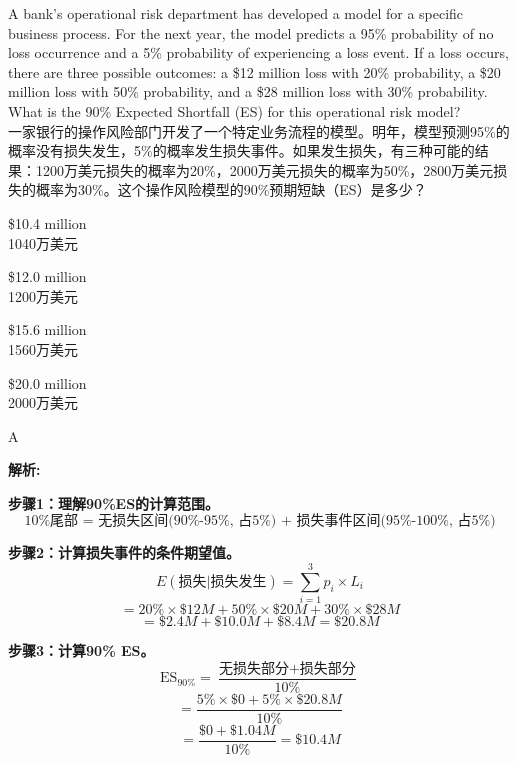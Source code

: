 \documentclass{article}
\newcounter{question} %
\newenvironment{explanation}
{\textbf{解析:}\par}
{\par}
\begin{document}
\begin{question}
    A bank's operational risk department has developed a model for a specific business process. For the next year, the model predicts a 95\% probability of no loss occurrence and a 5\% probability of experiencing a loss event. If a loss occurs, there are three possible outcomes: a \$12 million loss with 20\% probability, a \$20 million loss with 50\% probability, and a \$28 million loss with 30\% probability. What is the 90\% Expected Shortfall (ES) for this operational risk model?
    \\一家银行的操作风险部门开发了一个特定业务流程的模型。明年，模型预测95\%的概率没有损失发生，5\%的概率发生损失事件。如果发生损失，有三种可能的结果：1200万美元损失的概率为20\%，2000万美元损失的概率为50\%，2800万美元损失的概率为30\%。这个操作风险模型的90\%预期短缺（ES）是多少？
\end{question}

\begin{choices}
    \item \$10.4 million\\
    1040万美元
    
    \item \$12.0 million\\
    1200万美元
    
    \item \$15.6 million\\
    1560万美元
    
    \item \$20.0 million\\
    2000万美元
\end{choices}

\begin{correctanswer}
    A
\end{correctanswer}

\begin{explanation}
    \textbf{步骤1：理解90\%ES的计算范围。}
        \[
        \text{10\%尾部 = 无损失区间(90\%-95\%, 占5\%) + 损失事件区间(95\%-100\%, 占5\%)}
        \]

    \textbf{步骤2：计算损失事件的条件期望值。}
        \[
        E(\text{损失}|\text{损失发生}) = \sum_{i=1}^{3} p_i \times L_i
        \]
        \[
        = 20\% \times \$12M + 50\% \times \$20M + 30\% \times \$28M
        \]
        \[
        = \$2.4M + \$10.0M + \$8.4M = \$20.8M
        \]

    \textbf{步骤3：计算90\% ES。}
        \[
        \text{ES}_{90\%} = \frac{\text{无损失部分} + \text{损失部分}}{10\%}
        \]
        \[
        = \frac{5\% \times \$0 + 5\% \times \$20.8M}{10\%}
        \]
        \[
        = \frac{\$0 + \$1.04M}{10\%} = \$10.4M
        \]
\end{explanation}
\end{document}
